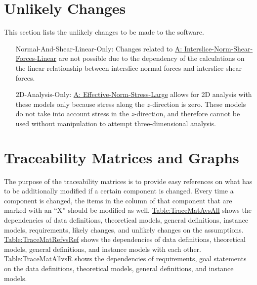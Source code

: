 \documentclass[12pt]{article}
\begin{document}
\section{Unlikely Changes}
\label{Sec:UCs}
This section lists the unlikely changes to be made to the software.

\begin{itemize}
\item[Normal-And-Shear-Linear-Only:\phantomsection\label{UC_normshearlinear}]Changes related to \hyperref[assumpINSFL]{A: Interslice-Norm-Shear-Forces-Linear} are not possible due to the dependency of the calculations on the linear relationship between interslice normal forces and interslice shear forces.
\item[2D-Analysis-Only:\phantomsection\label{UC_2donly}]\hyperref[assumpENSL]{A: Effective-Norm-Stress-Large} allows for 2D analysis with these models only because stress along the $z$-direction is zero. These models do not take into account stress in the $z$-direction, and therefore cannot be used without manipulation to attempt three-dimensional analysis.
\end{itemize}
\section{Traceability Matrices and Graphs}
\label{Sec:TraceMatrices}
The purpose of the traceability matrices is to provide easy references on what has to be additionally modified if a certain component is changed. Every time a component is changed, the items in the column of that component that are marked with an ``X'' should be modified as well. \hyperref[Table:TraceMatAvsAll]{Table:TraceMatAvsAll} shows the dependencies of data definitions, theoretical models, general definitions, instance models, requirements, likely changes, and unlikely changes on the assumptions. \hyperref[Table:TraceMatRefvsRef]{Table:TraceMatRefvsRef} shows the dependencies of data definitions, theoretical models, general definitions, and instance models with each other. \hyperref[Table:TraceMatAllvsR]{Table:TraceMatAllvsR} shows the dependencies of requirements, goal statements on the data definitions, theoretical models, general definitions, and instance models.
\end{document}
